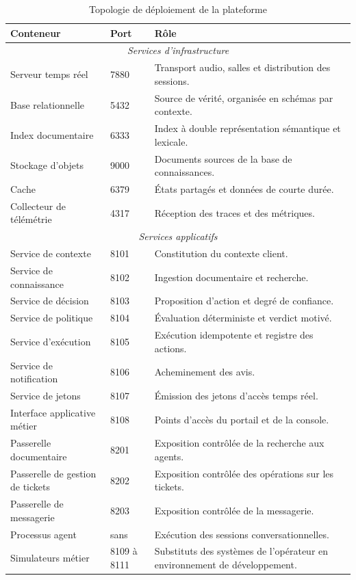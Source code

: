 \begin{table}[H]
\centering
\renewcommand{\arraystretch}{1.2}
\begin{tabular}{|p{3.6cm}|p{1.7cm}|p{9.2cm}|}
\hline
\textbf{Conteneur} & \textbf{Port} & \textbf{Rôle} \\
\hline
\multicolumn{3}{|c|}{\textit{Services d'infrastructure}} \\
\hline
Serveur temps réel & 7880 & Transport audio, salles et distribution des sessions. \\
\hline
Base relationnelle & 5432 & Source de vérité, organisée en schémas par contexte. \\
\hline
Index documentaire & 6333 & Index à double représentation sémantique et lexicale. \\
\hline
Stockage d'objets & 9000 & Documents sources de la base de connaissances. \\
\hline
Cache & 6379 & États partagés et données de courte durée. \\
\hline
Collecteur de télémétrie & 4317 & Réception des traces et des métriques. \\
\hline
\multicolumn{3}{|c|}{\textit{Services applicatifs}} \\
\hline
Service de contexte & 8101 & Constitution du contexte client. \\
\hline
Service de connaissance & 8102 & Ingestion documentaire et recherche. \\
\hline
Service de décision & 8103 & Proposition d'action et degré de confiance. \\
\hline
Service de politique & 8104 & Évaluation déterministe et verdict motivé. \\
\hline
Service d'exécution & 8105 & Exécution idempotente et registre des actions. \\
\hline
Service de notification & 8106 & Acheminement des avis. \\
\hline
Service de jetons & 8107 & Émission des jetons d'accès temps réel. \\
\hline
Interface applicative métier & 8108 & Points d'accès du portail et de la console. \\
\hline
Passerelle documentaire & 8201 & Exposition contrôlée de la recherche aux agents. \\
\hline
Passerelle de gestion de tickets & 8202 & Exposition contrôlée des opérations sur les tickets. \\
\hline
Passerelle de messagerie & 8203 & Exposition contrôlée de la messagerie. \\
\hline
Processus agent & sans & Exécution des sessions conversationnelles. \\
\hline
Simulateurs métier & 8109 à 8111 & Substituts des systèmes de l'opérateur en environnement de développement. \\
\hline
\end{tabular}
\caption{Topologie de déploiement de la plateforme}
\label{tab:deploiement}
\end{table}

